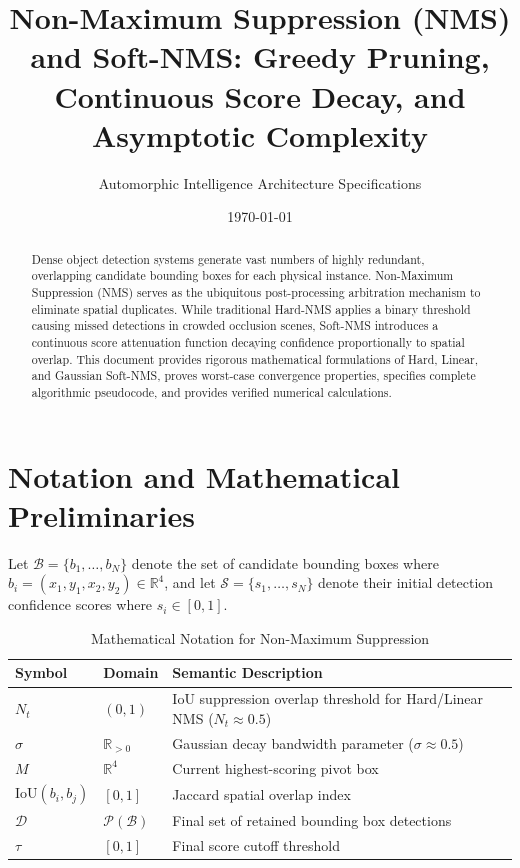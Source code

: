 \documentclass[11pt,a4paper]{article}
\title{Non-Maximum Suppression (NMS) and Soft-NMS: Greedy Pruning, Continuous Score Decay, and Asymptotic Complexity}
\author{Automorphic Intelligence Architecture Specifications}
\date{\today}
\theoremstyle{definition}
\begin{document}
\maketitle

\begin{abstract}
Dense object detection systems generate vast numbers of highly redundant, overlapping candidate bounding boxes for each physical instance. Non-Maximum Suppression (NMS) serves as the ubiquitous post-processing arbitration mechanism to eliminate spatial duplicates. While traditional Hard-NMS applies a binary threshold causing missed detections in crowded occlusion scenes, Soft-NMS introduces a continuous score attenuation function decaying confidence proportionally to spatial overlap. This document provides rigorous mathematical formulations of Hard, Linear, and Gaussian Soft-NMS, proves worst-case convergence properties, specifies complete algorithmic pseudocode, and provides verified numerical calculations.
\end{abstract}

\section{Notation and Mathematical Preliminaries}

Let $\mathcal{B} = \{b_1, \dots, b_N\}$ denote the set of candidate bounding boxes where $b_i = (x_1, y_1, x_2, y_2) \in \mathbb{R}^4$, and let $\mathcal{S} = \{s_1, \dots, s_N\}$ denote their initial detection confidence scores where $s_i \in [0, 1]$.

\begin{table}[h]
\centering
\caption{Mathematical Notation for Non-Maximum Suppression}
\begin{tabular}{lll}
\toprule
\textbf{Symbol} & \textbf{Domain} & \textbf{Semantic Description} \\
\midrule
$N_t$ & $(0, 1)$ & IoU suppression overlap threshold for Hard/Linear NMS ($N_t \approx 0.5$) \\
$\sigma$ & $\mathbb{R}_{> 0}$ & Gaussian decay bandwidth parameter ($\sigma \approx 0.5$) \\
$M$ & $\mathbb{R}^4$ & Current highest-scoring pivot box \\
$\text{IoU}(b_i, b_j)$ & $[0, 1]$ & Jaccard spatial overlap index \\
$\mathcal{D}$ & $\mathcal{P}(\mathcal{B})$ & Final set of retained bounding box detections \\
$\tau$ & $[0, 1]$ & Final score cutoff threshold \\
\bottomrule
\end{tabular}
\end{table}
\end{document}
